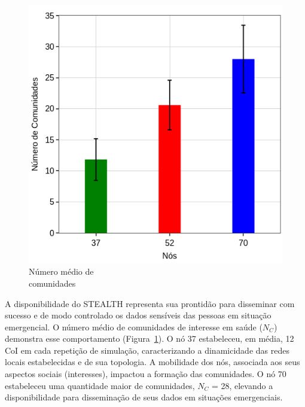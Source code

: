 \documentclass[12pt]{article}
\begin{document}
\begin{figure}
\centering
\includegraphics[width=.35\textwidth]{figures/coi_mean_performance_3_SBSEG19_v2.png}
\vspace{-0.5cm}
\caption[Número médio de comunidades]
{Número médio de \\ comunidades\endtabular}
\label{fig:coiEstabelecidas}
\end{figure}    

A
disponibilidade
do STEALTH
representa sua
prontidão
para disseminar com sucesso e de modo controlado os dados sensíveis das pessoas em situação emergencial.
O
número médio de comunidades de interesse em saúde ($N_{C}$) demonstra esse comportamento (Figura~\ref{fig:coiEstabelecidas}).
O nó 37 estabeleceu, em média, 12 CoI
em
cada repetição de simulação,
caracterizando
a dinamicidade das redes locais estabelecidas
e de sua topologia. A mobilidade dos nós,
associada aos seus aspectos sociais (interesses),
impactou a formação
das
comunidades. O nó 70 estabeleceu uma quantidade
maior de comunidades, $N_C$ = 28,
elevando
a disponibilidade para disseminação de seus dados em situações emergenciais.
\end{document}
